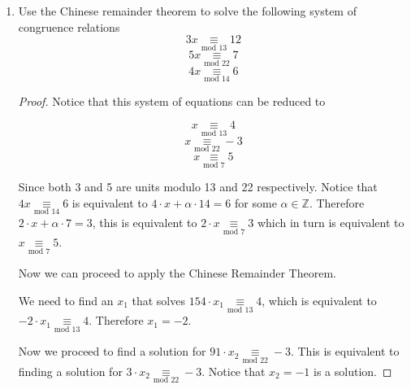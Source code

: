 \documentclass[12pt]{article}
\begin{document}
\begin{enumerate}
\begin{proof}
        Now consider the equation $x^n \underset{\textrm{mod }p}{\equiv} u$ for some $u \underset{\textrm{mod } p}{\not\equiv} 0$.
        
        Notice that $u$ is a unit in $\mathbb Z_p$, therefore $u^{z}$ is well defined for all $z \in \mathbb Z_p$. Since $\textrm{gcd}(a,p-1) = 1$ there exists $\alpha, \beta \in \mathbb Z$ such that $\alpha \cdot (p-1) + \beta \cdot a = 1 $. It follows that in $\mathbb Z_p$: 
        $$ u^{\alpha \cdot (p-1) + \beta \cdot a}= u$$
        $$ (u^{(p-1)})^{\alpha} \cdot (u^{\beta})^a = u$$
        $$ (u^{\beta})^a = u$$
        
        Therefore $u^\beta$ is a solution for equation $x^n \underset{\textrm{mod }p}{\equiv} u$.
    \end{proof}
    
    \item Use the Chinese remainder theorem to solve the following system of congruence relations
    $$ 3x \underset{\textrm{mod }13}{\equiv}12$$
    $$ 5x \underset{\textrm{mod }22}{\equiv}7$$
    $$ 4x \underset{\textrm{mod }14}{\equiv}6$$
    
    \begin{proof}
       Notice that this system of equations can be reduced to
       
       $$ x \underset{\textrm{mod }13}{\equiv} 4 $$
       $$ x \underset{\textrm{mod }22}{\equiv} -3$$
       $$ x \underset{\textrm{mod }7}{\equiv} 5$$
       
       Since both 3 and 5 are units modulo 13 and 22 respectively. Notice that $4x \underset{\textrm{mod }14}{\equiv}6$ is equivalent to $4 \cdot x + \alpha \cdot 14 = 6$ for some $\alpha \in \mathbb Z$. Therefore $ 2 \cdot x + \alpha \cdot 7 = 3$, this is equivalent to $2 \cdot x \underset{\textrm{mod }7}{\equiv}3 $ which in turn is equivalent to $x \underset{\textrm{mod }7}{\equiv} 5$.
       
       Now we can proceed to apply the Chinese Remainder Theorem.
       
       We need to find an $x_1$ that solves $ 154 \cdot x_1 \underset{\textrm{mod }13}{\equiv} 4$, which is equivalent to $-2 \cdot x_1 \underset{\textrm{mod }13}{\equiv} 4$. Therefore $x_1 = -2$.
       
       Now we proceed to find a solution for $91 \cdot x_2 \underset{\textrm{mod }22}{\equiv} -3$. This is equivalent to finding a solution for $3 \cdot x_2 \underset{\textrm{mod }22}{\equiv} -3$. Notice that $x_2 = -1$ is a solution.
       

\end{proof}
\end{enumerate}
\end{document}
